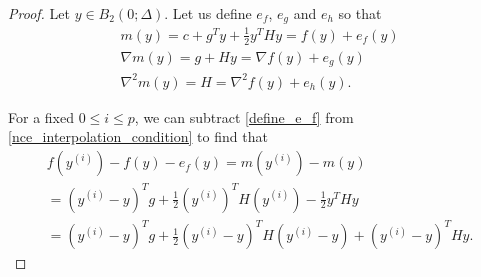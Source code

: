 \begin{proof}


Let $y \in B_2(0; \Delta)$.
Let us define $e_f$, $e_g$ and $e_h$ so that
\begin{align}
m(y) = c + g^T y + \frac 1 2 y^T H y = f(y) + e_f(y) \label{define_e_f} \\
\nabla m(y) = g + H y = \nabla f(y) + e_g(y) \nonumber \\
\nabla^2 m(y) = H = \nabla^2 f(y) + e_h(y). \nonumber
\end{align}

For a fixed $0 \le i \le p$, we can subtract \cref{define_e_f} from \cref{nce_interpolation_condition} to find that
\begin{align}
f\left(y^{(i)}\right) - f(y) - e_f(y)
= m\left(y^{(i)}\right) - m(y) \nonumber \\
= \left(y^{(i)} - y\right)^Tg + \frac 1 2 \left(y^{(i)}\right)^T H \left(y^{(i)}\right) - \frac 1 2 y^T H y \nonumber \\
= \left(y^{(i)} - y\right)^T g  + \frac 1 2 \left(y^{(i)} - y\right)^T H \left(y^{(i)} - y\right) + \left(y^{(i)} - y\right)^TH y. \label{nec_eqn2}
\end{align}



\end{proof}
